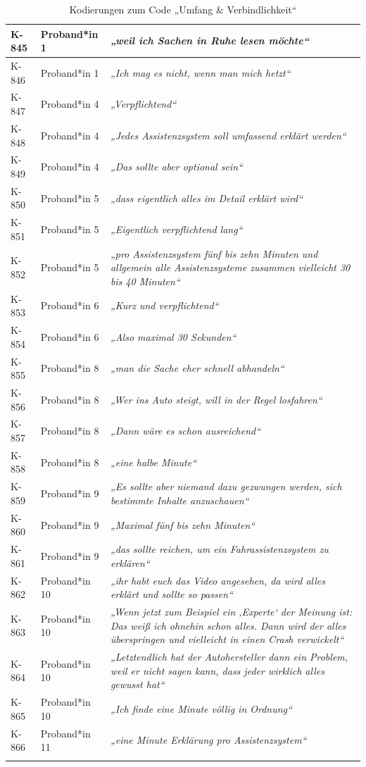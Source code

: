 {\begin{xltabular}{\textwidth}{
    |P{0.10\textwidth}
    |P{0.17\textwidth}
    |Y|
}
K-845 & Proband*in 1 & \textit{„weil ich Sachen in Ruhe lesen möchte“} \\
\hline
K-846 & Proband*in 1 & \textit{„Ich mag es nicht, wenn man mich hetzt“} \\
\hline
K-847 & Proband*in 4 & \textit{„Verpflichtend“} \\
\hline
K-848 & Proband*in 4 & \textit{„Jedes Assistenzsystem soll umfassend erklärt werden“} \\
\hline
K-849 & Proband*in 4 & \textit{„Das sollte aber optional sein“} \\
\hline
K-850 & Proband*in 5 & \textit{„dass eigentlich alles im Detail erklärt wird“} \\
\hline
K-851 & Proband*in 5 & \textit{„Eigentlich verpflichtend lang“} \\
\hline
K-852 & Proband*in 5 & \textit{„pro Assistenzsystem fünf bis zehn Minuten und allgemein alle Assistenzsysteme zusammen vielleicht 30 bis 40 Minuten“} \\
\hline
K-853 & Proband*in 6 & \textit{„Kurz und verpflichtend“} \\
\hline
K-854 & Proband*in 6 & \textit{„Also maximal 30 Sekunden“} \\
\hline
K-855 & Proband*in 8 & \textit{„man die Sache eher schnell abhandeln“} \\
\hline
K-856 & Proband*in 8 & \textit{„Wer ins Auto steigt, will in der Regel losfahren“} \\
\hline
K-857 & Proband*in 8 & \textit{„Dann wäre es schon ausreichend“} \\
\hline
K-858 & Proband*in 8 & \textit{„eine halbe Minute“} \\
\hline
K-859 & Proband*in 9 & \textit{„Es sollte aber niemand dazu gezwungen werden, sich bestimmte Inhalte anzuschauen“} \\
\hline
K-860 & Proband*in 9 & \textit{„Maximal fünf bis zehn Minuten“} \\
\hline
K-861 & Proband*in 9 & \textit{„das sollte reichen, um ein Fahrassistenzsystem zu erklären“} \\
\hline
K-862 & Proband*in 10 & \textit{„ihr habt euch das Video angesehen, da wird alles erklärt und sollte so passen“} \\
\hline
K-863 & Proband*in 10 & \textit{„Wenn jetzt zum Beispiel ein ‚Experte‘ der Meinung ist: Das weiß ich ohnehin schon alles. Dann wird der alles überspringen und vielleicht in einen Crash verwickelt“} \\
\hline
K-864 & Proband*in 10 & \textit{„Letztendlich hat der Autohersteller dann ein Problem, weil er nicht sagen kann, dass jeder wirklich alles gewusst hat“} \\
\hline
K-865 & Proband*in 10 & \textit{„Ich finde eine Minute völlig in Ordnung“} \\
\hline
K-866 & Proband*in 11 & \textit{„eine Minute Erklärung pro Assistenzsystem“} \\
\hline
\caption{Kodierungen zum Code „Umfang \& Verbindlichkeit“}\label{tab:kodiernachweis-umfang-und-verbindlichkeit}\\
\end{xltabular}
}

